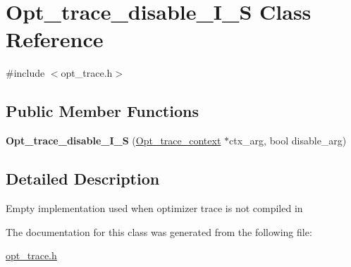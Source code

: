 \hypertarget{classOpt__trace__disable__I__S}{}\section{Opt\+\_\+trace\+\_\+disable\+\_\+\+I\+\_\+S Class Reference}
\label{classOpt__trace__disable__I__S}


{\ttfamily \#include $<$opt\+\_\+trace.\+h$>$}

\subsection*{Public Member Functions}
\begin{DoxyCompactItemize}
\item 
\mbox{\label{classOpt__trace__disable__I__S_aaf2b39f826007edf1a01c340edab9660}} 
{\bfseries Opt\+\_\+trace\+\_\+disable\+\_\+\+I\+\_\+S} (\mbox{\hyperlink{classOpt__trace__context}{Opt\+\_\+trace\+\_\+context}} $\ast$ctx\+\_\+arg, bool disable\+\_\+arg)
\end{DoxyCompactItemize}


\subsection{Detailed Description}
Empty implementation used when optimizer trace is not compiled in 

The documentation for this class was generated from the following file\+:\begin{DoxyCompactItemize}
\item 
\mbox{\hyperlink{opt__trace_8h}{opt\+\_\+trace.\+h}}\end{DoxyCompactItemize}
